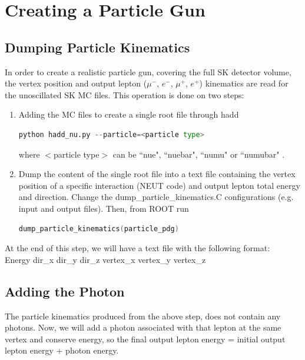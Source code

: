 \documentclass[12pt]{article}
\begin{document}
\section{Creating a Particle Gun}
\subsection{Dumping Particle Kinematics}
\label{dump_particle_kinematics}
In order to create a realistic particle gun, covering the full SK detector volume, the vertex position and output lepton ($\mu^-$, $e^-$, $\mu^+$, $e^+$) kinematics are read for the unoscillated SK MC files. This operation is done on two steps:\\
\begin{enumerate}
	\item Adding the MC files to create a single root file through hadd\\
\begin{lstlisting}[language=Python, caption=Combining MC ROOT files]
python hadd_nu.py --particle=<particle type>							
\end{lstlisting}
where $<$particle type$>$ can  be ``nue", ``nuebar", ``numu" or ``numubar" .
	\item Dump the content of the single root file into a text file containing the vertex position of a specific interaction (NEUT code) and output lepton total energy and direction. 
Change the dump\_particle\_kinematics.C configurations (e.g. input and output files). Then, from ROOT run
\begin{lstlisting}[language=C++, caption=Dumping Particle Kinematics]
dump_particle_kinematics(particle_pdg)	
\end{lstlisting}	
\end{enumerate}
At the end of this step, we will have a text file with the following format:\\
Energy dir\_x dir\_y dir\_z vertex\_x vertex\_y vertex\_z 	
\subsection{Adding the Photon}
The particle kinematics produced from the above step, does not contain any photons. Now, we will add a photon associated with that lepton at the same vertex and conserve energy, so the final output lepton energy = initial output lepton energy + photon energy.\\
\end{document}

